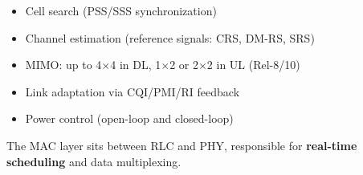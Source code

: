 
\begin{itemize}
\tightlist
\item
  Cell search (PSS/\allowbreak{}SSS synchronization)
\item
  Channel estimation (reference signals: CRS, DM-RS, SRS)
\item
  MIMO: up to 4\ensuremath{\times}4 in DL, 1\ensuremath{\times}2 or 2\ensuremath{\times}2 in UL (Rel-8/\allowbreak{}10)
\item
  Link adaptation via CQI/\allowbreak{}PMI/\allowbreak{}RI feedback
\item
  Power control (open-loop and closed-loop)
\end{itemize}


The MAC layer sits between RLC and PHY, responsible for \textbf{real-time scheduling} and data multiplexing.


